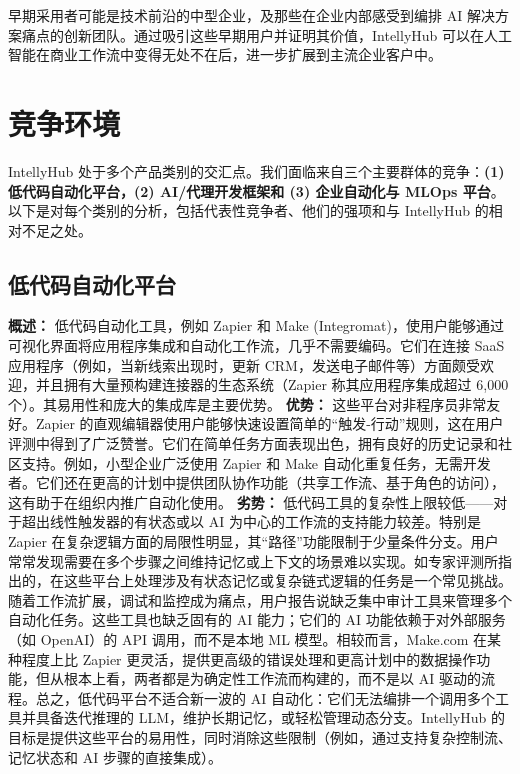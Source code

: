\documentclass[11pt, a4paper, oneside]{article}
\begin{document}
早期采用者可能是技术前沿的中型企业，及那些在企业内部感受到编排 AI 解决方案痛点的创新团队。通过吸引这些早期用户并证明其价值，IntellyHub 可以在人工智能在商业工作流中变得无处不在后，进一步扩展到主流企业客户中。

\section{竞争环境}
IntellyHub 处于多个产品类别的交汇点。我们面临来自三个主要群体的竞争：\textbf{(1) 低代码自动化平台，(2) AI/代理开发框架和 (3) 企业自动化与 MLOps 平台}。以下是对每个类别的分析，包括代表性竞争者、他们的强项和与 IntellyHub 的相对不足之处。

\subsection{低代码自动化平台}

\textbf{概述：} 低代码自动化工具，例如 Zapier 和 Make (Integromat)，使用户能够通过可视化界面将应用程序集成和自动化工作流，几乎不需要编码。它们在连接 SaaS 应用程序（例如，当新线索出现时，更新 CRM，发送电子邮件等）方面颇受欢迎，并且拥有大量预构建连接器的生态系统（Zapier 称其应用程序集成超过 6,000 个\cite{zapierApps}）。其易用性和庞大的集成库是主要优势。\newline\newline
\textbf{优势：} 这些平台对非程序员非常友好。Zapier 的直观编辑器使用户能够快速设置简单的“触发-行动”规则，这在用户评测中得到了广泛赞誉\cite{g2ZapierReviews}。它们在简单任务方面表现出色，拥有良好的历史记录和社区支持。例如，小型企业广泛使用 Zapier 和 Make 自动化重复任务，无需开发者。它们还在更高的计划中提供团队协作功能（共享工作流、基于角色的访问），这有助于在组织内推广自动化使用\cite{zapierPricing}。\newline \newline
\textbf{劣势：} 低代码工具的复杂性上限较低——对于超出线性触发器的有状态或以 AI 为中心的工作流的支持能力较差。特别是 Zapier 在复杂逻辑方面的局限性明显，其“路径”功能限制于少量条件分支。用户常常发现需要在多个步骤之间维持记忆或上下文的场景难以实现。如专家评测所指出的，在这些平台上处理涉及有状态记忆或复杂链式逻辑的任务是一个常见挑战。随着工作流扩展，调试和监控成为痛点，用户报告说缺乏集中审计工具来管理多个自动化任务\cite{g2ZapierReviews}。这些工具也缺乏固有的 AI 能力；它们的 AI 功能依赖于对外部服务（如 OpenAI）的 API 调用，而不是本地 ML 模型\cite{zapierOpenAI}。相较而言，Make.com 在某种程度上比 Zapier 更灵活，提供更高级的错误处理和更高计划中的数据操作功能\cite{g2MakeVsZapier}，但从根本上看，两者都是为确定性工作流而构建的，而不是以 AI 驱动的流程。总之，低代码平台不适合新一波的 AI 自动化：它们无法编排一个调用多个工具并具备迭代推理的 LLM，维护长期记忆，或轻松管理动态分支。IntellyHub 的目标是提供这些平台的易用性，同时消除这些限制（例如，通过支持复杂控制流、记忆状态和 AI 步骤的直接集成）。
\end{document}
